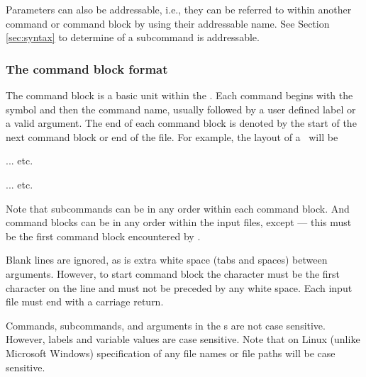 Parameters can also be addressable, i.e., they can be referred to within another command or command block by using their addressable name. See Section \ref{sec:syntax} to determine of a subcommand is addressable.

\subsubsection{The command block format}\label{sec:CommandBlockFormat}

The command block is a basic unit within the \config. Each command begins with the symbol \command{} and then the command name, usually followed by a user defined label or a valid argument. The end of each command block is denoted by the start of the next command block or end of the file. For example, the layout of a \config\ will be

\begin{description}
	\item {} 
	\item {} 
	\item {} 
	\item ... etc.
	\item {} 
	\item {} 
	\item {} 
	\item ... etc.
\end{description}

Note that subcommands can be in any order within each command block. And command blocks can be in any order within the input files, except  --- this must be the first command block encountered by \CNAME.

Blank lines are ignored, as is extra white space (tabs and spaces) between arguments. However, to start command block the \command{} character must be the first character on the line and must not be preceded by any white space. Each input file must end with a carriage return.

Commands, subcommands, and arguments in the \config s are not case sensitive. However, labels and variable values are case sensitive. Note that on Linux (unlike Microsoft Windows) specification of any file names or file paths will be case sensitive.

